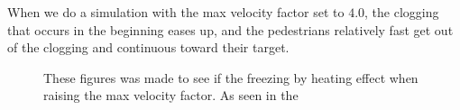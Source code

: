 When we do a simulation with the max velocity factor set to $4.0$, the clogging
that occurs in the beginning eases up, and the pedestrians relatively fast
get out of the clogging and continuous toward their target.

\begin{figure}
\centering
{}
\caption{These figures was made to see if the freezing by heating effect when raising the max velocity factor. As seen in the }
\label{fig:freezingbyheating}
\end{figure}
